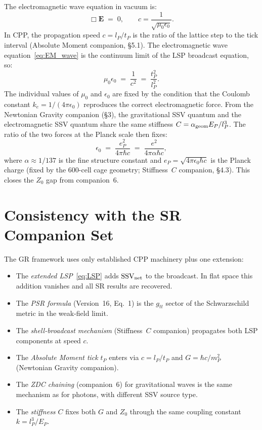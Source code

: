 \documentclass[12pt]{article}
\newcommand{\lP}{l_P}
\newcommand{\tP}{t_P}
\newcommand{\EP}{E_P}
\newcommand{\mP}{m_P}
\newcommand{\SSV}{\text{SSV}}
\newcommand{\alphageom}{\alpha_{\rm geom}}
\begin{document}
The electromagnetic wave equation in vacuum is:
\begin{equation}
  \Box\mathbf{E} \;=\; 0, \qquad c = \frac{1}{\sqrt{\mu_0\epsilon_0}}.
  \label{eq:EM_wave}
\end{equation}
In CPP, the propagation speed $c = \lP/\tP$ is the ratio of the lattice
step to the tick interval (Absolute Moment companion, \S5.1).  The
electromagnetic wave equation~\eqref{eq:EM_wave} is the continuum limit
of the LSP broadcast equation, so:
\begin{equation}
  \mu_0\epsilon_0 \;=\; \frac{1}{c^2} \;=\; \frac{\tP^2}{\lP^2}.
  \label{eq:mu0eps0}
\end{equation}
The individual values of $\mu_0$ and $\epsilon_0$ are fixed by the
condition that the Coulomb constant $k_e = 1/(4\pi\epsilon_0)$ reproduces
the correct electromagnetic force.  From the Newtonian Gravity companion
(\S3), the gravitational SSV quantum and the electromagnetic SSV quantum
share the same stiffness $C = \alphageom\EP/\lP^3$.  The ratio of the
two forces at the Planck scale then fixes:
\begin{equation}
  \epsilon_0 \;=\; \frac{e_P^2}{4\pi\hbar c}
  \;=\; \frac{e^2}{4\pi\alpha\hbar c},
  \label{eq:eps0}
\end{equation}
where $\alpha \approx 1/137$ is the fine structure constant and
$e_P = \sqrt{4\pi\epsilon_0\hbar c}$ is the Planck charge (fixed by the
600-cell cage geometry; Stiffness~$C$ companion, \S4.3).  This closes the
$Z_0$ gap from companion~6.

\section{Consistency with the SR Companion Set}
\label{sec:consistency}

The GR framework uses only established CPP machinery plus one extension:

\begin{itemize}[noitemsep]
  \item The \emph{extended LSP}~\eqref{eq:LSP} adds $\mathbf{\SSV}_{\rm net}$
    to the broadcast.  In flat space this addition vanishes and all SR
    results are recovered.
  \item The \emph{PSR formula} (Version~16, Eq.~1) is the $g_{tt}$ sector
    of the Schwarzschild metric in the weak-field limit.
  \item The \emph{shell-broadcast mechanism} (Stiffness~$C$ companion)
    propagates both LSP components at speed $c$.
  \item The \emph{Absolute Moment tick} $\tP$ enters via $c = \lP/\tP$
    and $G = \hbar c/\mP^2$ (Newtonian Gravity companion).
  \item The \emph{ZDC chaining} (companion~6) for gravitational waves is
    the same mechanism as for photons, with different SSV source type.
  \item The \emph{stiffness $C$} fixes both $G$ and $Z_0$ through the
    same coupling constant $k = \lP^3/\EP$.
\end{itemize}
\end{document}
